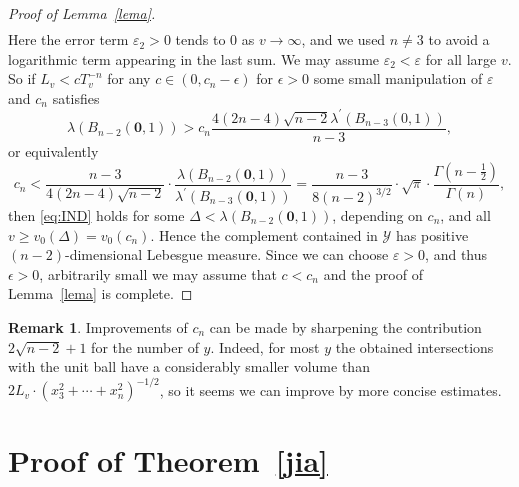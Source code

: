 \documentclass[10pt]{amsart}
\theoremstyle{definition}
\newtheorem{remark}{Remark}
\begin{document}
\begin{proof}[Proof of Lemma~\ref{lema}]
\begin{align*}
\end{align*}
Here the error term $\varepsilon_2>0$ tends to $0$ as $v\to\infty$, and we used $n\ne 3$ to avoid a logarithmic term appearing in the last sum. 
We may assume $\varepsilon_2< \varepsilon$ for all large $v$.
So if $L_v< c T_v^{-n}$ for any $c\in(0,c_n-\epsilon)$ for 
$\epsilon>0$ some small manipulation of
$\varepsilon$ and $c_n$ satisfies
\[
\lambda(B_{n-2}(\boldsymbol{0},1))> c_n\frac{ 4(2n-4)\sqrt{n-2}\lambda^{\prime}(B_{n-3}(0,1)) }{ n-3 },
\]
or equivalently
\[
c_n < \frac{n-3}{4(2n-4)\sqrt{n-2}}\cdot \frac{\lambda(B_{n-2}(\boldsymbol{0},1))}{\lambda^{\prime}(B_{n-3}(\boldsymbol{0},1))}=
\frac{n-3}{8(n-2)^{3/2}}\cdot \sqrt{\pi}\cdot \frac{ \Gamma(n-\frac{1}{2})}{\Gamma(n)},
\]
then \eqref{eq:IND} holds for some $\Delta< \lambda(B_{n-2}(\boldsymbol{0},1))$,
depending on $c_n$, and all $v\ge v_0(\Delta) = v_0(c_n)$. Hence
the complement contained in $\mathcal{Y}$ has positive $(n-2)$-dimensional
Lebesgue measure. Since
we can choose $\varepsilon>0$, and thus $\epsilon>0$, arbitrarily small we may assume that $c<c_n$ and
the proof of Lemma~\ref{lema} is complete.
\end{proof}


\begin{remark}
	Improvements of $c_n$ can be made by sharpening the contribution $2\sqrt{n-2}+1$ for the number of $y$. Indeed,
	for most $y$ the obtained intersections with the unit ball have a considerably smaller volume than $2L_v \cdot (x_3^2+\cdots+x_n^2)^{-1/2}$, so it seems we can improve by more concise estimates.
\end{remark}



\section{Proof of Theorem~\ref{jia} } \label{Sect7}
\end{document}
